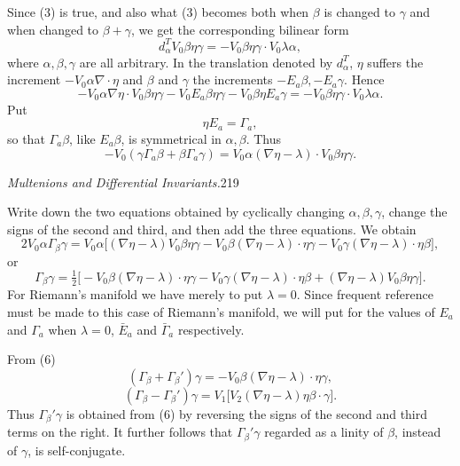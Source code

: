 \documentclass[11pt]{article}
\begin{document}
Since (3) is true, and also what (3) becomes both when $\beta$ is changed to $\gamma$ and when changed to $\beta+\gamma$, we get the corresponding bilinear form
\begin{equation}d_\alpha^T V_0\beta\eta\gamma=-V_0\beta\eta\gamma\cdot V_0\lambda\alpha,\tag{4}\end{equation}
where $\alpha,\beta,\gamma$ are all arbitrary. In the translation denoted by $d_\alpha^T$, $\eta$ suffers the increment $-V_0\alpha\nabla\cdot\eta$ and $\beta$ and $\gamma$ the increments $-E_a\beta,-E_a\gamma$. Hence
\[
-V_0\alpha\nabla\eta\cdot V_0\beta\eta\gamma-V_0E_a\beta\eta\gamma-V_0\beta\eta E_a\gamma=-V_0\beta\eta\gamma\cdot V_0\lambda\alpha.
\]
Put
\begin{equation}\eta E_a=\Gamma_a,\tag{5}\end{equation}
so that $\Gamma_a\beta$, like $E_a\beta$, is symmetrical in $\alpha,\beta$. Thus
\[
-V_0(\gamma\Gamma_a\beta+\beta\Gamma_a\gamma)=V_0\alpha(\nabla\eta-\lambda)\cdot V_0\beta\eta\gamma.
\]
\newpage\thispagestyle{empty}\begin{center}\textit{Multenions and Differential Invariants.}\hfill 219\end{center}
Write down the two equations obtained by cyclically changing $\alpha,\beta,\gamma$, change the signs of the second and third, and then add the three equations. We obtain
\[
2V_0\alpha\Gamma_\beta\gamma=V_0\alpha\bigl[(\nabla\eta-\lambda)V_0\beta\eta\gamma-V_0\beta(\nabla\eta-\lambda)\cdot\eta\gamma-V_0\gamma(\nabla\eta-\lambda)\cdot\eta\beta\bigr],
\]
or
\begin{equation}\Gamma_\beta\gamma=\tfrac12\bigl[-V_0\beta(\nabla\eta-\lambda)\cdot\eta\gamma-V_0\gamma(\nabla\eta-\lambda)\cdot\eta\beta+(\nabla\eta-\lambda)V_0\beta\eta\gamma\bigr].\tag{6}\end{equation}
For Riemann's manifold we have merely to put $\lambda=0$. Since frequent reference must be made to this case of Riemann's manifold, we will put for the values of $E_a$ and $\Gamma_a$ when $\lambda=0$, $\bar E_a$ and $\bar\Gamma_a$ respectively.

\indent From (6)
\begin{equation}(\Gamma_\beta+\Gamma_\beta')\gamma=-V_0\beta(\nabla\eta-\lambda)\cdot\eta\gamma,\tag{7}\end{equation}
\begin{equation}(\Gamma_\beta-\Gamma_\beta')\gamma=V_1\bigl[V_2(\nabla\eta-\lambda)\eta\beta\cdot\gamma\bigr].\tag{8}\end{equation}
Thus $\Gamma_\beta'\gamma$ is obtained from (6) by reversing the signs of the second and third terms on the right. It further follows that $\Gamma_\beta'\gamma$ regarded as a linity of $\beta$, instead of $\gamma$, is self-conjugate.
\end{document}

